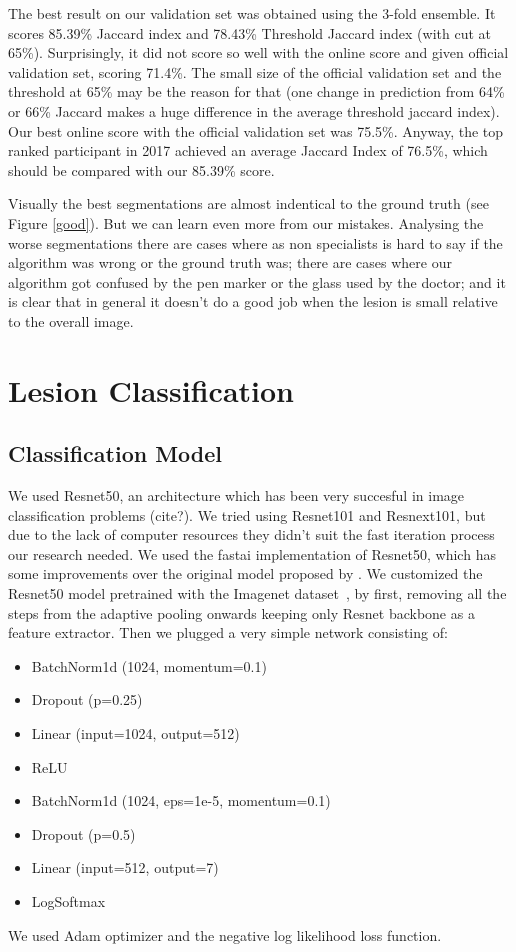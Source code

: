 \documentclass[conference]{IEEEtran}
\begin{document}
The best result on our validation set was obtained using the 3-fold ensemble.  It scores 85.39\% Jaccard index and 78.43\% Threshold Jaccard index (with cut at 65\%). Surprisingly, it did not score so well with the online score and given official validation set, scoring 71.4\%.  The small size of the official validation set and the threshold at 65\% may be the reason for that (one change in prediction from 64\% or 66\% Jaccard makes a huge difference in the average threshold jaccard index). Our best online score with the official validation set was 75.5\%. Anyway, the top ranked participant in 2017 achieved an average Jaccard Index of 76.5\%, which should be compared with our 85.39\% score.

Visually the best segmentations are almost indentical to the ground truth (see Figure \ref{good}). But we can learn even more from our mistakes. Analysing the worse segmentations there are cases where as non specialists is hard to say if the algorithm was wrong or the ground truth was; there are cases where our algorithm got confused by the pen marker or the glass used by the doctor; and it is clear that in general it doesn't do a good job when the lesion is small relative to the overall image. 

\section{Lesion Classification}
\label{classification}

\subsection{Classification Model}
We used Resnet50, an architecture which has been very succesful in image classification problems (cite?). We tried using Resnet101 and Resnext101, but due to the lack of computer resources they didn't suit the fast iteration process our research needed. We used the fastai implementation of Resnet50, which has some improvements over the original model proposed by \cite{resnet}. We customized the Resnet50 model pretrained with the Imagenet dataset~\cite{imagenet}, by first, removing all the steps from the adaptive pooling onwards keeping only Resnet backbone as a feature extractor. Then we plugged a very simple network consisting of:
\begin{itemize}
\item BatchNorm1d (1024, momentum=0.1)
\item Dropout (p=0.25)
\item Linear (input=1024, output=512)
\item ReLU 
\item BatchNorm1d (1024, eps=1e-5, momentum=0.1)
\item Dropout (p=0.5)
\item Linear (input=512, output=7)
\item LogSoftmax
\end{itemize}
We used Adam optimizer and the negative log likelihood loss function.
\end{document}
